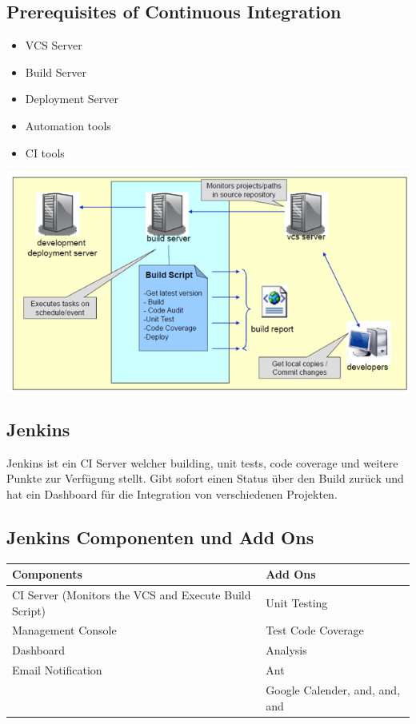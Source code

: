 \documentclass[10pt]{article}
\begin{document}
    \subsection{Prerequisites of Continuous Integration} 
    \begin{multicols}{2}
    	    \begin{itemize}
        \item VCS Server
        \item Build Server
        \item Deployment Server
        \item Automation tools
        \item CI tools
    \end{itemize}
    \includegraphics[scale=0.5]{assets/vorbedingung_ci.png}
    \end{multicols}   
	
	
    \subsection{Jenkins}
    Jenkins ist ein CI Server welcher building, unit tests, code coverage und weitere Punkte zur Verf\"ugung stellt.
    Gibt sofort einen Status \"uber den Build zur\"uck und hat ein Dashboard f\"ur die Integration von verschiedenen Projekten.

    \subsection{Jenkins Componenten und Add Ons}
    \begin{center}
        \begin{tabular}{|ll|}
            \hline
            Components & Add Ons \\
            \hline
            CI Server (Monitors the VCS and Execute Build Script) & Unit Testing \\
            Management Console & Test Code Coverage \\
            Dashboard & Analysis \\
            Email Notification & Ant \\
            & Google Calender, and, and, and \\
            \hline
        \end{tabular}
    \end{center}
	\newpage
	
\end{document}
